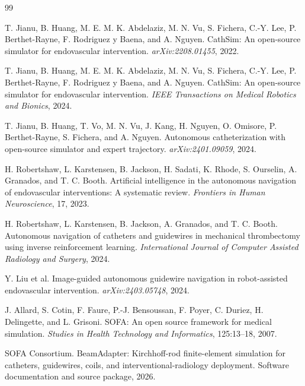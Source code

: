 \documentclass[11pt]{article}
\begin{document}
\FloatBarrier
\clearpage
\begin{thebibliography}{99}

T. Jianu, B. Huang, M. E. M. K. Abdelaziz, M. N. Vu, S. Fichera, C.-Y. Lee, P. Berthet-Rayne, F. Rodriguez y Baena, and A. Nguyen.
\newblock CathSim: An open-source simulator for endovascular intervention.
\newblock \emph{arXiv:2208.01455}, 2022.

T. Jianu, B. Huang, M. E. M. K. Abdelaziz, M. N. Vu, S. Fichera, C.-Y. Lee, P. Berthet-Rayne, F. Rodriguez y Baena, and A. Nguyen.
\newblock CathSim: An open-source simulator for endovascular intervention.
\newblock \emph{IEEE Transactions on Medical Robotics and Bionics}, 2024.

T. Jianu, B. Huang, T. Vo, M. N. Vu, J. Kang, H. Nguyen, O. Omisore, P. Berthet-Rayne, S. Fichera, and A. Nguyen.
\newblock Autonomous catheterization with open-source simulator and expert trajectory.
\newblock \emph{arXiv:2401.09059}, 2024.

H. Robertshaw, L. Karstensen, B. Jackson, H. Sadati, K. Rhode, S. Ourselin, A. Granados, and T. C. Booth.
\newblock Artificial intelligence in the autonomous navigation of endovascular interventions: A systematic review.
\newblock \emph{Frontiers in Human Neuroscience}, 17, 2023.

H. Robertshaw, L. Karstensen, B. Jackson, A. Granados, and T. C. Booth.
\newblock Autonomous navigation of catheters and guidewires in mechanical thrombectomy using inverse reinforcement learning.
\newblock \emph{International Journal of Computer Assisted Radiology and Surgery}, 2024.

Y. Liu et al.
\newblock Image-guided autonomous guidewire navigation in robot-assisted endovascular intervention.
\newblock \emph{arXiv:2403.05748}, 2024.

J. Allard, S. Cotin, F. Faure, P.-J. Bensoussan, F. Poyer, C. Duriez, H. Delingette, and L. Grisoni.
\newblock SOFA: An open source framework for medical simulation.
\newblock \emph{Studies in Health Technology and Informatics}, 125:13--18, 2007.

SOFA Consortium.
\newblock BeamAdapter: Kirchhoff-rod finite-element simulation for catheters, guidewires, coils, and interventional-radiology deployment.
\newblock Software documentation and source package, 2026.


\end{thebibliography}
\end{document}
